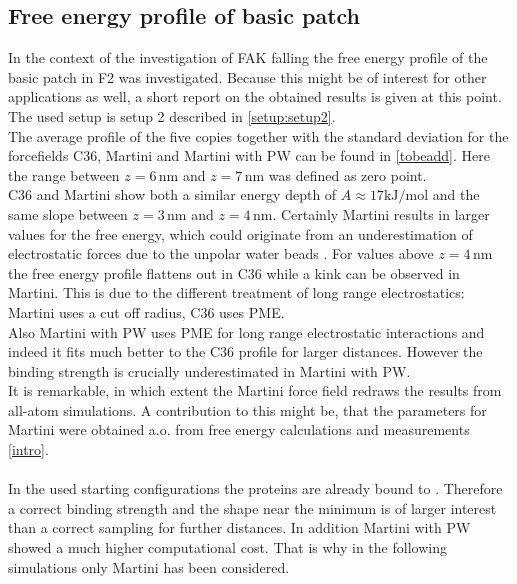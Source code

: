 \subsection{Free energy profile of basic patch}
In the context of the investigation of FAK falling the free energy profile of the basic patch in F2 was investigated. Because this might be of interest for other applications as well, a short report on the obtained results is given at this point. The used setup is setup 2 described in \autoref{setup:setup2}.\\
The average profile of the five copies together with the standard deviation for the forcefields C36, Martini and Martini with PW can be found in \autoref{tobeadd}. Here the range between $z = 6\,\si{\nano\metre}$ and $z = 7\,\si{\nano\metre}$ was defined as zero point.\\
C36 and Martini show both a similar energy depth of $A \approx 17 \si{\kilo\joule/\mole}$ and the same slope between $z = 3\,\si{\nano\metre}$ and $z = 4\,\si{\nano\metre}$. Certainly Martini results in larger values for the free energy, which could originate from an underestimation of electrostatic forces due to the unpolar water beads \autocite{introOrPaper}. For values above $z = 4\,\si{\nano\metre}$ the free energy profile flattens out in C36 while a kink can be observed in Martini. This is due to the different treatment of long range electrostatics: Martini uses a cut off radius, C36 uses PME.\\
Also Martini with PW uses PME for long range electrostatic interactions and indeed it fits much better to the C36 profile for larger distances. However the binding strength is crucially underestimated in Martini with PW.\\
It is remarkable, in which extent the Martini force field redraws the results from all-atom simulations. A contribution to this might be, that the parameters for Martini were obtained a.o. from free energy calculations and measurements \autoref{intro}.\\
\\
In the used starting configurations the proteins are already bound to \pip{}. Therefore a correct binding strength and the shape near the minimum is of larger interest than a correct sampling for further distances. In addition Martini with PW showed a much higher computational cost. That is why in the following simulations only Martini has been considered.